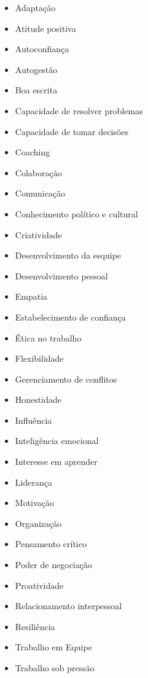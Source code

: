 \begin{itemize}
	\label{softskills}
	\item Adaptação
	\item Atitude positiva
	\item Autoconfiança
	\item Autogestão
	\item Boa escrita
	\item Capacidade de resolver problemas
	\item Capacidade de tomar decisões
	\item Coaching
	\item Colaboração
	\item Comunicação
	\item Conhecimento político e cultural
	\item Criatividade
	\item Desenvolvimento da esquipe
	\item Desenvolvimento pessoal
	\item Empatia
	\item Estabelecimento de confiança
	\item Ética no trabalho
	\item Flexibilidade
	\item Gerenciamento de conflitos
	\item Honestidade
	\item Influência
	\item Inteligência emocional
	\item Interesse em aprender
	\item Liderança
	\item Motivação
	\item Organização
	\item Pensamento crítico
	\item Poder de negociação
	\item Proatividade
	\item Relacionamento interpessoal
	\item Resiliência
	\item Trabalho em Equipe
	\item Trabalho sob pressão
\end{itemize}